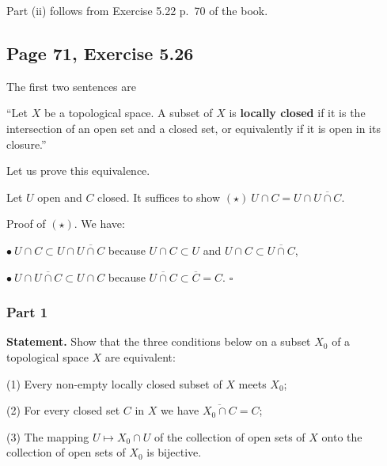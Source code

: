 \documentclass[parskip=half,fontsize=12pt]{scrartcl}%
\begin{document}
Part (ii) %
follows from Exercise 5.22 p.~70 of the book.

\subsection{Page 71, Exercise 5.26}%

The first two sentences are

``Let $X$ be a topological space. A subset of $X$ is \textbf{locally closed} if it is the intersection of an open set and a closed set, or equivalently if it is open in its closure.'' 

Let us prove this equivalence.

Let $U$ open and $C$ closed. It suffices to show $(\star)\ U\cap C=U\cap\overline{U\cap C}$. 

Proof of $(\star)$. We have:

$\bullet\ U\cap C\subset U\cap\overline{U\cap C}$ because $U\cap C\subset U$ and $U\cap C\subset\overline{U\cap C}$,

$\bullet\ U\cap\overline{U\cap C}\subset U\cap C$ because $\overline{U\cap C}\subset\overline C=C$. $\square$ %

\subsubsection{Part 1}

\textbf{Statement.} Show that the three conditions below on a subset $X_0$ of a topological space $X$ are equivalent:

(1) Every non-empty locally closed subset of $X$ meets $X_0$;

(2) For every closed set $C$ in $X$ we have $\overline{X_0\cap C}=C$;

(3) The mapping $U\mapsto X_0\cap U$ of the collection of open sets of $X$ onto the collection of open sets of $X_0$ is bijective.
\end{document}
